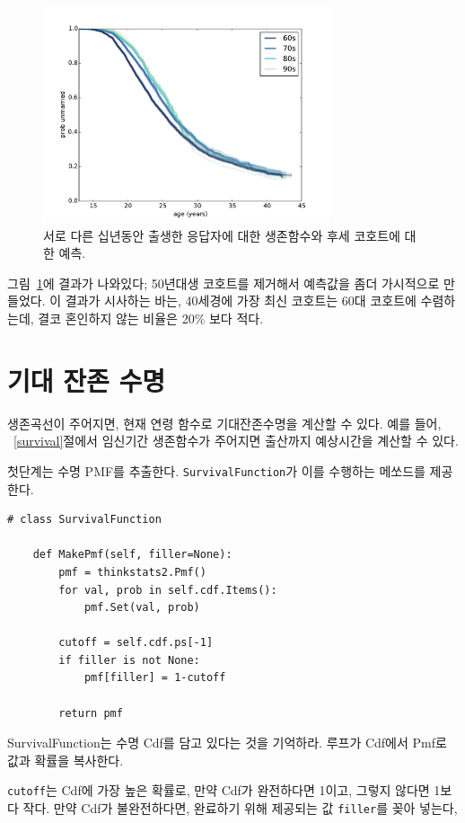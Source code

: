 \begin{figure}
\centerline{\includegraphics[height=2.5in]{figs/survival5.pdf}}
\caption{서로 다른 십년동안 출생한 응답자에 대한 생존함수와 후세 코호트에 대한 예측.}
\label{survival5}
\end{figure}

그림~\ref{survival5}에 결과가 나와있다; 50년대생 코호트를 제거해서 예측값을 좀더 가시적으로 만들었다. 이 결과가 시사하는 바는, 40세경에 가장 최신 코호트는 60대 코호트에 수렴하는데, 결코 혼인하지 않는 비율은 20\% 보다 적다.


\section{기대 잔존 수명}

생존곡선이 주어지면, 현재 연령 함수로 기대잔존수명을 계산할 수 있다.
예를 들어, ~\ref{survival}절에서 임신기간 생존함수가 주어지면 출산까지 예상시간을 계산할 수 있다.

첫단계는 수명 PMF를 추출한다. {\tt SurvivalFunction}가 이를 수행하는 메쏘드를 제공한다.

\begin{verbatim}
# class SurvivalFunction

    def MakePmf(self, filler=None):
        pmf = thinkstats2.Pmf()
        for val, prob in self.cdf.Items():
            pmf.Set(val, prob)

        cutoff = self.cdf.ps[-1]
        if filler is not None:
            pmf[filler] = 1-cutoff

        return pmf
\end{verbatim}

SurvivalFunction는 수명 Cdf를 담고 있다는 것을 기억하라. 루프가 Cdf에서 Pmf로 값과 확률을 복사한다.

{\tt cutoff}는 Cdf에 가장 높은 확률로, 만약 Cdf가 완전하다면 1이고, 그렇지 않다면 1보다 작다. 만약 Cdf가 불완전하다면, 완료하기 위해 제공되는 값 {\tt filler}를 꽂아 넣는다,

